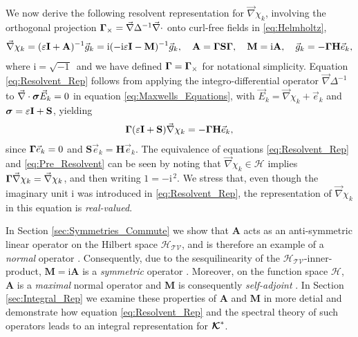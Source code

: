 \documentclass[11pt]{amsart}
\newcommand{\I}{\mathrm{i}}
\newcommand{\Mb}{\mathbf{M}}
\newcommand{\Hb}{\mathbf{H}}
\newcommand{\Ib}{\mathbf{I}}
\newcommand{\Sb}{\mathbf{S}}
\newcommand{\Ab}{\mathbf{A}}
\newcommand\Kbc{\mbox{\boldmath${\mathcal{K}}$}}
\newcommand{\Tc}{\mathcal{T}}
\newcommand{\Vc}{\mathcal{V}}
\newcommand{\Hs}{\mathscr{H}}
\newcommand\bsig{\mbox{\boldmath${\sigma}$}}
\newcommand\bGamma{\mbox{\boldmath${\Gamma}$}}
\begin{document}
We now derive the following resolvent representation for $\vec{\nabla}\chi_k$,
involving the orthogonal projection $\bGamma_\times=\vec{\nabla}\Delta^{-1}\vec{\nabla}\cdot$
onto curl-free fields in \eqref{eq:Helmholtz}, 
% 
\begin{align}\label{eq:Resolvent_Rep}
  \vec{\nabla}\chi_k=(\varepsilon\Ib+\Ab)^{-1}\vec{g}_k
           =\I(-\I\varepsilon\Ib-\Mb)^{-1}\vec{g}_k, \quad
  \Ab=\bGamma\Sb\bGamma, \quad
  \Mb=\I\Ab, \quad
  \vec{g}_k=-\bGamma\Hb\vec{e}_k,
\end{align}
%
where $\I=\sqrt{-1}\,$ and we have defined $\bGamma=\bGamma_\times$ for
notational simplicity. Equation \eqref{eq:Resolvent_Rep} follows from
applying the integro-differential operator $\vec{\nabla}\Delta^{-1}$ to
$\vec{\nabla}\cdot\bsig\vec{E}_k=0$ in equation \eqref{eq:Maxwells_Equations},
with $\vec{E}_k=\vec{\nabla}\chi_k+\vec{e}_k$ and $\bsig=\varepsilon\Ib+\Sb$, yielding  
%
\begin{align}\label{eq:Pre_Resolvent}
  \bGamma(\varepsilon\Ib+\Sb)\vec{\nabla}\chi_k=-\bGamma\Hb\vec{e}_k,
\end{align}
%
since $\bGamma\vec{e}_k=0$ and $\Sb\vec{e}_k=\Hb\vec{e}_k$.
The equivalence of equations \eqref{eq:Resolvent_Rep} and
\eqref{eq:Pre_Resolvent} can be seen by noting that
$\vec{\nabla}\chi_k\in\Hs$ implies $\bGamma\vec{\nabla}\chi_k=\vec{\nabla}\chi_k$,
and then writing $1=-\I^{\,2}$. We stress that, even though the
imaginary unit $\I$ was introduced in \eqref{eq:Resolvent_Rep}, the
representation of $\vec{\nabla}\chi_k$ in this equation is
\emph{real-valued}. 



In Section \ref{sec:Symmetries_Commute} we show that $\Ab$ acts as an
anti-symmetric linear operator on the Hilbert space $\Hs_{\Tc\Vc}$, 
and is therefore an example of a \emph{normal} operator
\cite{Stone:64}. Consequently, due to the sesquilinearity of the
$\Hs_{\Tc\Vc}$-inner-product, $\Mb=\I\Ab$ is a \emph{symmetric}
operator \cite{Reed-1980,Stone:64}. Moreover, on the function space 
$\Hs$, $\Ab$ is a \emph{maximal} normal operator and
$\Mb$ is consequently \emph{self-adjoint} \cite{Stone:64}. In Section
\ref{sec:Integral_Rep} we examine these properties of $\Ab$ and $\Mb$ 
in more detial and demonstrate how equation \eqref{eq:Resolvent_Rep}
and the spectral theory of such operators leads to an integral
representation for $\Kbc^*$.     
\end{document}
